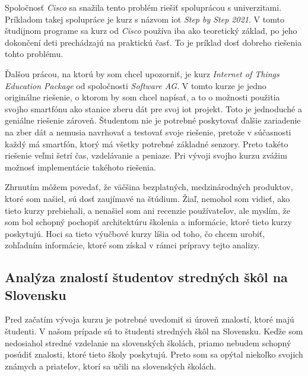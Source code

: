 Spoločnosť \textit{Cisco} sa snažila tento problém riešiť spoluprácou s univerzitami. Príkladom takej spolupráce je kurz s názvom \gls{iot} \textit{Step by Step 2021}\cite{educInit}. V tomto študijnom programe sa kurz od \textit{Cisco} používa iba ako teoretický základ, po jeho dokončení deti prechádzajú na praktickú časť. To je príklad dosť dobreho riešenia tohto problému.

Ďalšou prácou, na ktorú by som chcel upozorniť, je kurz \textit{Internet of Things Education Package}\cite{educPac} od spoločnosti \textit{Software AG}. V tomto kurze je jedno originálne riešenie, o ktorom by som chcel napísať, a to o možnosti použitia svojho smartfónu ako stanice zberu dát pre svoj \gls{iot} projekt. Toto je jednoduché a geniálne riešenie zároveň. Študentom nie je potrebné poskytovať ďalšie zariadenie na zber dát a nemusia navrhovať a testovať svoje riešenie, pretože v súčasnosti každý má smartfón, ktorý má všetky potrebné základné senzory. Preto takéto riešenie veľmi šetrí čas, vzdelávanie a peniaze. Pri vývoji svojho kurzu zvážim možnosť implementácie takéhoto riešenia.

Zhrnutím môžem povedať, že väčšina bezplatných, medzinárodných produktov, ktoré som našiel, sú dosť zaujímavé na štúdium. Žiaľ, nemohol som vidieť, ako tieto kurzy prebiehali, a nenašiel som ani recenzie používateľov, ale myslím, že som bol schopný pochopiť architektúru školenia a informácie, ktoré tieto kurzy poskytujú. Hoci sa tieto výučbové kurzy líšia od toho, čo chcem urobiť, zohľadním informácie, ktoré som získal v rámci prípravy tejto analizy.


\subsection{Analýza znalostí študentov stredných škôl na Slovensku}
Pred začatím vývoja kurzu je potrebné uvedomiť si úroveň znalostí, ktoré majú študenti. V našom prípade sú to študenti stredných škôl na Slovensku. Keďže som nedosiahol stredné vzdelanie na slovenských školách, priamo nebudem schopný posúdiť znalosti, ktoré tieto školy poskytujú. Preto som sa opýtal niekoľko svojich známych a priateľov, ktorí sa učili na slovenských školách.


